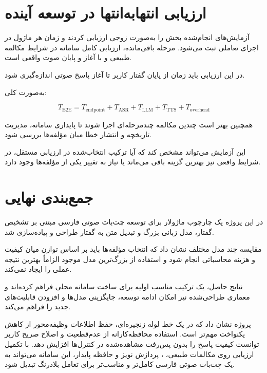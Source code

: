 \section{ارزیابی انتهابه‌انتها در توسعه آینده}

آزمایش‌های انجام‌شده بخش  را به‌صورت زوجی ارزیابی
کردند و زمان هر ماژول در اجرای تعاملی ثبت می‌شود. مرحله باقی‌مانده،
ارزیابی کامل سامانه در شرایط مکالمه طبیعی و با آغاز و پایان صوت
واقعی است.

در این ارزیابی باید زمان از پایان گفتار کاربر تا آغاز پاسخ
صوتی اندازه‌گیری شود.

به‌صورت کلی:

\begin{equation}
T_{\mathrm{E2E}}
=
T_{\mathrm{endpoint}}
+
T_{\mathrm{ASR}}
+
T_{\mathrm{LLM}}
+
T_{\mathrm{TTS}}
+
T_{\mathrm{overhead}}
\end{equation}

همچنین بهتر است چندین مکالمه چندمرحله‌ای اجرا شوند تا پایداری
سامانه، مدیریت تاریخچه و انتشار خطا میان مؤلفه‌ها بررسی شود.

این آزمایش می‌تواند مشخص کند که آیا ترکیب انتخاب‌شده در
ارزیابی مستقل، در شرایط واقعی نیز بهترین گزینه باقی می‌ماند
یا نیاز به تغییر یکی از مؤلفه‌ها وجود دارد.


\section{جمع‌بندی نهایی}

در این پروژه یک چارچوب ماژولار برای توسعه چت‌بات صوتی فارسی
مبتنی بر تشخیص گفتار، مدل زبانی بزرگ و تبدیل متن به گفتار
طراحی و پیاده‌سازی شد.

مقایسه چند مدل مختلف نشان داد که انتخاب مؤلفه‌ها باید بر اساس
توازن میان کیفیت و هزینه محاسباتی انجام شود و استفاده از
بزرگ‌ترین مدل موجود الزاماً بهترین نتیجه عملی را ایجاد
نمی‌کند.

نتایج حاصل، یک ترکیب مناسب اولیه برای ساخت سامانه محلی فراهم
کرده‌اند و معماری طراحی‌شده نیز امکان ادامه توسعه، جایگزینی
مدل‌ها و افزودن قابلیت‌های جدید را فراهم می‌کند.

پروژه نشان داد که در یک خط لوله زنجیره‌ای، حفظ اطلاعات
وظیفه‌محور از کاهش یکنواخت  مهم‌تر است. استفاده
محافظه‌کارانه از عدم‌قطعیت و اصلاح صریح کاربر توانست کیفیت پاسخ
را بدون پس‌رفت مشاهده‌شده در کنترل‌ها افزایش دهد. با تکمیل
ارزیابی روی مکالمات طبیعی، ، پردازش نویز و حافظه پایدار،
این سامانه می‌تواند به یک چت‌بات صوتی فارسی کامل‌تر و مناسب‌تر
برای تعامل بلادرنگ تبدیل شود.
